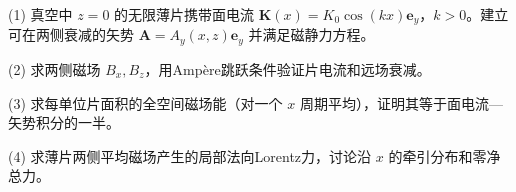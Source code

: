(1) 真空中 \(z=0\) 的无限薄片携带面电流 \(\mathbf K(x)=K_0\cos(kx)\mathbf e_y\)，\(k>0\)。建立可在两侧衰减的矢势 \(\mathbf A=A_y(x,z)\mathbf e_y\) 并满足磁静力方程。

(2) 求两侧磁场 \(B_x,B_z\)，用Ampère跳跃条件验证片电流和远场衰减。

(3) 求每单位片面积的全空间磁场能（对一个 \(x\) 周期平均），证明其等于面电流—矢势积分的一半。

(4) 求薄片两侧平均磁场产生的局部法向Lorentz力，讨论沿 \(x\) 的牵引分布和零净总力。
